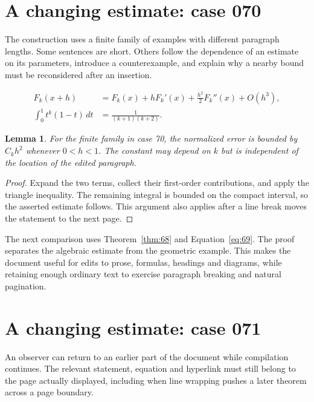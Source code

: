 \documentclass[a4paper,10pt]{article}
\newtheorem{lemma}[theorem]{Lemma}
\begin{document}
\lipsum[18]

\section{A changing estimate: case 070}\label{unit:69}
The construction uses a finite family of examples with different paragraph lengths. Some sentences are short. Others follow the dependence of an estimate on its parameters, introduce a counterexample, and explain why a nearby bound must be reconsidered after an insertion.

\lipsum[28-29]
\begin{align}\label{eq:69}
 F_k(x+h)&=F_k(x)+hF_k'(x)+\frac{h^2}{2}F_k''(x)+O(h^3),\\
 \int_0^1 t^k(1-t)\,dt&=\frac{1}{(k+1)(k+2)}.
\end{align}
\begin{lemma}\label{thm:69}
For the finite family in case 70, the normalized error is bounded by $C_k h^2$ whenever $0<h<1$. The constant may depend on $k$ but is independent of the location of the edited paragraph.
\end{lemma}
\begin{proof}
Expand the two terms, collect their first-order contributions, and apply the
triangle inequality. The remaining integral is bounded on the compact interval,
so the asserted estimate follows. This argument also applies after a line break
moves the statement to the next page.
\end{proof}
\begin{center}
\end{center}
The next comparison uses Theorem~\ref{thm:68} and Equation~\ref{eq:69}. The proof separates the algebraic estimate from the geometric example. This makes the document useful for edits to prose, formulas, headings and diagrams, while retaining enough ordinary text to exercise paragraph breaking and natural pagination.

\lipsum[23]

\section{A changing estimate: case 071}\label{unit:70}
An observer can return to an earlier part of the document while compilation continues. The relevant statement, equation and hyperlink must still belong to the page actually displayed, including when line wrapping pushes a later theorem across a page boundary.
\end{document}
